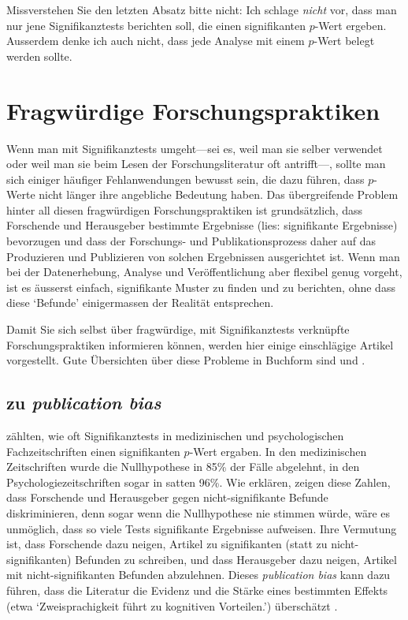 \documentclass[oneside, 10pt]{book}\usepackage[]{graphicx}\usepackage[]{xcolor}
\begin{document}
Missverstehen Sie den letzten Absatz bitte nicht:
Ich schlage \emph{nicht} vor, dass man nur jene Signifikanztests
berichten soll, die einen signifikanten $p$-Wert ergeben.
Ausserdem denke ich auch nicht, dass jede Analyse
mit einem $p$-Wert belegt werden sollte.


\chapter{Fragwürdige Forschungspraktiken}\label{ch:QRP}
Wenn man mit Signifikanztests umgeht---sei es, weil man
sie selber verwendet oder weil man sie beim Lesen der
Forschungsliteratur oft antrifft---, sollte man sich
einiger häufiger Fehlanwendungen bewusst sein,
die dazu führen, dass $p$-Werte nicht länger ihre
angebliche Bedeutung haben.
Das übergreifende Problem hinter all diesen fragwürdigen
Forschungspraktiken ist grundsätzlich, dass Forschende
und Herausgeber bestimmte Ergebnisse (lies: signifikante
Ergebnisse) bevorzugen und dass der Forschungs- und
Publikationsprozess daher auf das Produzieren und Publizieren
von solchen Ergebnissen ausgerichtet ist.
Wenn man bei der Datenerhebung, Analyse und Veröffentlichung
aber flexibel genug vorgeht, ist es äusserst einfach,
signifikante Muster zu finden und zu berichten, ohne
dass diese `Befunde' einigermassen der Realität entsprechen.

Damit Sie sich selbst über fragwürdige, mit Signifikanztests
verknüpfte Forschungspraktiken informieren können, werden
hier einige einschlägige Artikel vorgestellt.
Gute Übersichten über diese Probleme in Buchform
sind \citet[][\textit{The seven deadly sins of psychology}]{Chambers2017}
und \citet[][\textit{Science fictions}]{Stuart2021}.

\section{\citet{Sterling1995} zu \textit{publication bias}}
\citet[][4 Seiten Text]{Sterling1995} zählten,
wie oft Signifikanztests in 
medizinischen und psychologischen Fachzeitschriften einen
signifikanten $p$-Wert ergaben. In den medizinischen Zeitschriften
wurde die Nullhypothese in 85\% der Fälle abgelehnt,
in den Psychologiezeitschriften sogar in satten 96\%.
Wie \citeauthor{Sterling1995} erklären, zeigen diese Zahlen,
dass Forschende und Herausgeber gegen nicht-signifikante
Befunde diskriminieren, denn sogar wenn die Nullhypothese
nie stimmen würde, wäre es unmöglich, dass so viele Tests
signifikante Ergebnisse aufweisen. Ihre Vermutung ist,
dass Forschende dazu neigen, Artikel zu signifikanten
(statt zu nicht-signifikanten) Befunden zu schreiben,
und dass Herausgeber dazu neigen, Artikel mit nicht-signifikanten
Befunden abzulehnen.
Dieses \textit{publication bias} kann dazu führen,
dass die Literatur die Evidenz und die Stärke eines
bestimmten Effekts (etwa `Zweisprachigkeit führt
zu kognitiven Vorteilen.') überschätzt
\citep[siehe auch][]{DeBruin2015}.
\end{document}
